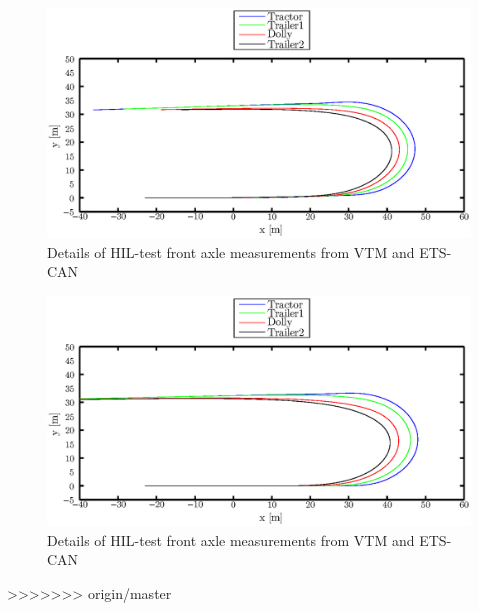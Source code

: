 \documentclass[ExampleMasters.tex]{subfiles}
\begin{document}
\begin{figure}[!htb]
	\centering
	\includegraphics[width=1\linewidth]{figures/HIL_Plot_for_180_deg_turn}
	\caption{Details of HIL-test front axle measurements from VTM and ETS-CAN}
	
	\label{fig:HIL_Plot_for_180_deg_turn}
\end{figure}


\begin{figure}[!htb]
	\centering
	\includegraphics[width=1\linewidth]{figures/VTM_Plot_for_180_deg_turn}
	\caption{Details of HIL-test front axle measurements from VTM and ETS-CAN}
	
	\label{fig:VTM_Plot_for_180_deg_turn}
\end{figure}

>>>>>>> origin/master
\end{document}
